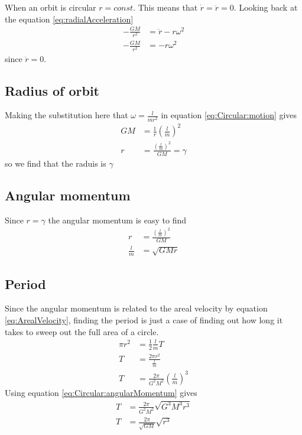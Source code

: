 When an orbit is circular $r=const$. This means that $\dot{r}=\ddot{r}=0$.
Looking back at the equation \ref{eq:radialAcceleration}
\begin{align}
-\frac{GM}{r^2} &=\ddot{r} - r \omega^2 \nonumber \\
-\frac{GM}{r^2} &= - r \omega^2 \label{eq:Circular:motion}
\end{align}
since $\ddot{r}=0$. 
\subsection{Radius of orbit}
Making the substitution here that $\omega=\frac{l}{mr^2}$ in equation \ref{eq:Circular:motion} gives
\begin{align}
GM&= \frac{1}{r} \left(\frac{l}{m}\right)^2 \nonumber \\
r&=\frac{\left(\frac{l}{m}\right)^2}{GM}=\gamma 
\end{align}
so we find that the raduis is $\gamma$

\subsection{Angular momentum}
Since $r=\gamma$ the angular momentum is easy to find
\begin{align}
r&=\frac{\left(\frac{l}{m}\right)^2}{GM} \nonumber \\
\frac{l}{m}&=\sqrt{GMr}\label{eq:Circular:angularMomentum}
\end{align}

\subsection{Period}
Since the angular momentum is related to the areal velocity by equation \ref{eq:ArealVelocity}, finding the period is just a case of finding out how long it takes to sweep out the full area of a circle.
\begin{align}
\pi r^2 &= \frac{1}{2}\frac{l}{m} T \nonumber \\
T&=\frac{2\pi r^2}{\frac{l}{m}} \nonumber \\
T&=\frac{2\pi}{G^2M^2} \left(\frac{l}{m}\right)^3
\end{align}
Using equation \ref{eq:Circular:angularMomentum} gives
\begin{align}
T&=\frac{2\pi}{G^2M^2}\sqrt{G^3M^3r^3}\nonumber\\
T&=\frac{2\pi}{\sqrt{GM}}\sqrt{r^3}
\end{align}
